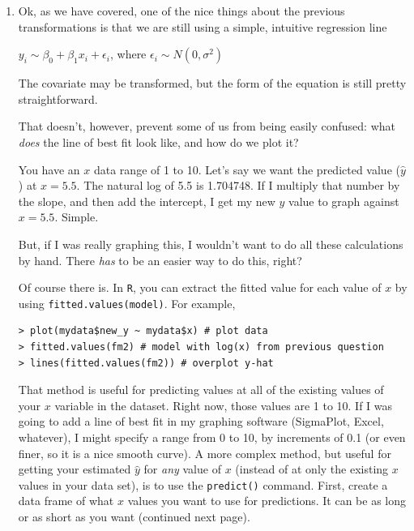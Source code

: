 \documentclass[
  letterpaper,
  DIV=11,
  numbers=noendperiod]{scrartcl}
\begin{document}
\begin{enumerate}
  (Actually, the residual plot still suggests that we have not fully
  captured the curve, but, for teaching and learning purposes, set this
  fact aside for now.)
\item
  Ok, as we have covered, one of the nice things about the previous
  transformations is that we are still using a simple, intuitive
  regression line

  \(y_i \sim \beta_0 + \beta_1x_i + \epsilon_i\), where
  \(\epsilon_i \sim N(0,\sigma^2)\)

  The covariate may be transformed, but the form of the equation is
  still pretty straightforward.

  That doesn't, however, prevent some of us from being easily confused:
  what \emph{does} the line of best fit look like, and how do we plot
  it?

  You have an \(x\) data range of 1 to 10. Let's say we want the
  predicted value (\(\hat{y}\)) at \(x=5.5\). The natural log of 5.5 is
  1.704748. If I multiply that number by the slope, and then add the
  intercept, I get my new \(y\) value to graph against \(x=5.5\).
  Simple.

  But, if I was really graphing this, I wouldn't want to do all these
  calculations by hand. There \emph{has} to be an easier way to do this,
  right?

  Of course there is. In \texttt{R}, you can extract the fitted value
  for each value of \(x\) by using \texttt{fitted.values(model)}. For
  example,

\begin{verbatim}
> plot(mydata$new_y ~ mydata$x) # plot data
> fitted.values(fm2) # model with log(x) from previous question
> lines(fitted.values(fm2)) # overplot y-hat
\end{verbatim}

  That method is useful for predicting values at all of the existing
  values of your \(x\) variable in the dataset. Right now, those values
  are 1 to 10. If I was going to add a line of best fit in my graphing
  software (SigmaPlot, Excel, whatever), I might specify a range from 0
  to 10, by increments of 0.1 (or even finer, so it is a nice smooth
  curve). A more complex method, but useful for getting your estimated
  \(\hat{y}\) for \emph{any} value of \(x\) (instead of at only the
  existing \(x\) values in your data set), is to use the
  \texttt{predict()} command. First, create a data frame of what \(x\)
  values you want to use for predictions. It can be as long or as short
  as you want (continued next page).


\end{enumerate}
\end{document}

